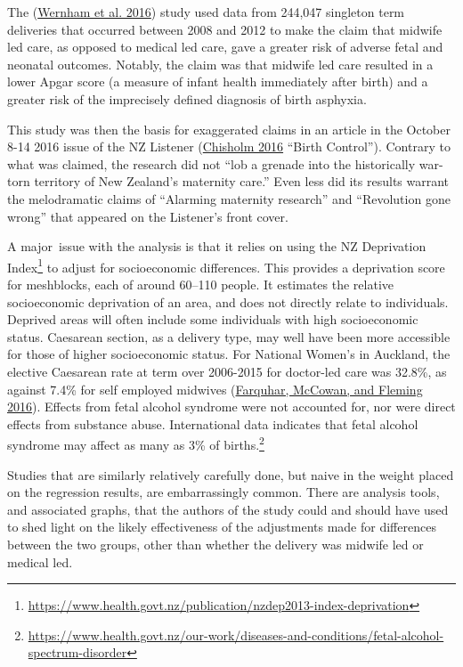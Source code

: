 \documentclass[
  10pt,
  b5paper]{book}
\begin{document}
The (\protect\hyperlink{ref-wernham_EtAl_2016}{Wernham et al. 2016}) study used data from 244,047 singleton
term deliveries that occurred between 2008 and 2012 to make the
claim that midwife led care, as opposed to medical led care, gave a
greater risk of adverse fetal and neonatal outcomes. Notably, the
claim was that midwife led care resulted in a lower Apgar score
(a measure of infant health immediately after birth) and a greater
risk of the imprecisely defined diagnosis of birth asphyxia.

This study was then the basis for exaggerated claims in an article
in the October 8-14 2016 issue of the NZ Listener
(\protect\hyperlink{ref-chisholm_2016}{Chisholm 2016} ``Birth Control''). Contrary to what was
claimed, the research did not
``lob a grenade into the historically war-torn territory of
New Zealand's maternity care.''
Even less did its results warrant the melodramatic claims of
``Alarming maternity research'' and ``Revolution gone wrong'' that
appeared on the Listener's front cover.

A major~issue with the analysis is that it relies on using the NZ
Deprivation Index\footnote{
  \url{https://www.health.govt.nz/publication/nzdep2013-index-deprivation}}
to adjust for socioeconomic differences. This provides a deprivation
score for meshblocks, each of around 60--110 people. It estimates the
relative socioeconomic deprivation of an area, and does not directly
relate to individuals. Deprived areas will often include some
individuals with high socioeconomic status. Caesarean section, as a
delivery type, may well have been more accessible for those of
higher socioeconomic status. For National Women's in Auckland,
the elective Caesarean rate at term over 2006-2015 for doctor-led
care was 32.8\%, as against 7.4\% for self employed midwives
(\protect\hyperlink{ref-farquhar2016letter}{Farquhar, McCowan, and Fleming 2016}). Effects from fetal alcohol syndrome were
not accounted for, nor were direct effects from substance abuse.
International data indicates that fetal alcohol syndrome may
affect as many as 3\% of
births.\footnote{\url{https://www.health.govt.nz/our-work/diseases-and-conditions/fetal-alcohol-spectrum-disorder}}

Studies that are similarly relatively carefully done,
but naive in the weight placed on the regression results,
are embarrassingly common. There are analysis tools, and
associated graphs, that the authors of the study could
and should have used to shed light on the likely
effectiveness of the adjustments made for differences
between the two groups, other than whether the delivery
was midwife led or medical led.
\end{document}
